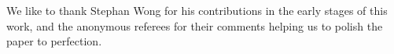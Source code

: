 We like to thank Stephan Wong for his contributions in the early stages of this
work, and the anonymous referees for their comments helping us to polish the
paper to perfection.
